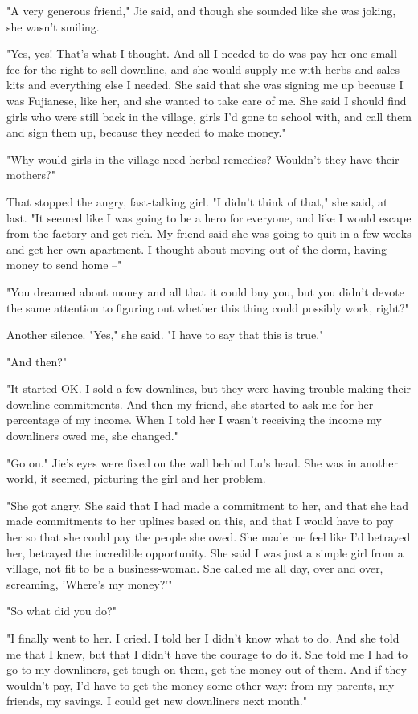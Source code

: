 "A very generous friend," Jie said, and though she sounded like she
was joking, she wasn't smiling.

"Yes, yes! That's what I thought. And all I needed to do was pay
her one small fee for the right to sell downline, and she would
supply me with herbs and sales kits and everything else I needed.
She said that she was signing me up because I was Fujianese, like
her, and she wanted to take care of me. She said I should find
girls who were still back in the village, girls I'd gone to school
with, and call them and sign them up, because they needed to make
money."

"Why would girls in the village need herbal remedies? Wouldn't they
have their mothers?"

That stopped the angry, fast-talking girl. "I didn't think of
that," she said, at last. "It seemed like I was going to be a hero
for everyone, and like I would escape from the factory and get
rich. My friend said she was going to quit in a few weeks and get
her own apartment. I thought about moving out of the dorm, having
money to send home --"

"You dreamed about money and all that it could buy you, but you
didn't devote the same attention to figuring out whether this thing
could possibly work, right?"

Another silence. "Yes," she said. "I have to say that this is
true."

"And then?"

"It started OK. I sold a few downlines, but they were having
trouble making their downline commitments. And then my friend, she
started to ask me for her percentage of my income. When I told her
I wasn't receiving the income my downliners owed me, she changed."

"Go on." Jie's eyes were fixed on the wall behind Lu's head. She
was in another world, it seemed, picturing the girl and her
problem.

"She got angry. She said that I had made a commitment to her, and
that she had made commitments to her uplines based on this, and
that I would have to pay her so that she could pay the people she
owed. She made me feel like I'd betrayed her, betrayed the
incredible opportunity. She said I was just a simple girl from a
village, not fit to be a business-woman. She called me all day,
over and over, screaming, 'Where's my money?'"

"So what did you do?"

"I finally went to her. I cried. I told her I didn't know what to
do. And she told me that I knew, but that I didn't have the courage
to do it. She told me I had to go to my downliners, get tough on
them, get the money out of them. And if they wouldn't pay, I'd have
to get the money some other way: from my parents, my friends, my
savings. I could get new downliners next month."

